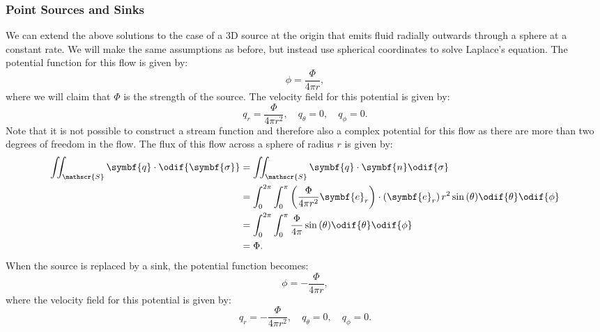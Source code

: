 \documentclass{article}
\theoremstyle{definition}
\begin{document}
\subsubsection{Point Sources and Sinks}
We can extend the above solutions to the case of a 3D source at the
origin that emits fluid radially outwards through a sphere at a
constant rate. We will make the same assumptions as before, but instead
use spherical coordinates to solve Laplace's equation. The potential
function for this flow is given by:
\begin{equation*}
    \phi = \frac{\Phi}{4\pi r},
\end{equation*}
where we will claim that \(\Phi\) is the strength of the source. The
velocity field for this potential is given by:
\begin{equation*}
    q_r = \frac{\Phi}{4\pi r^2}, \quad q_{\theta} = 0, \quad q_{\phi} = 0.
\end{equation*}
Note that it is not possible to construct a stream function and
therefore also a complex potential for this flow as there are more
than two degrees of freedom in the flow. The flux of this flow across a
sphere of radius \(r\) is given by:
\begin{align*}
    \iint_{\mathscr{S}} \symbf{q} \cdot \odif{\symbf{\sigma}} & = \iint_{\mathscr{S}} \symbf{q} \cdot \symbf{n} \odif{\sigma}                                                                                                                \\
                                                              & = \int_0^{2\pi} \int_0^{\pi} \left( \frac{\Phi}{4\pi r^2} \symbf{e}_{r} \right) \cdot \left( \symbf{e}_{r} \right) r^2 \sin{\left( \theta \right)} \odif{\theta} \odif{\phi} \\
                                                              & = \int_0^{2\pi} \int_0^{\pi} \frac{\Phi}{4\pi} \sin{\left( \theta \right)} \odif{\theta} \odif{\phi}                                                                         \\
                                                              & = \Phi.
\end{align*}
When the source is replaced by a sink, the potential function becomes:
\begin{equation*}
    \phi = -\frac{\Phi}{4\pi r},
\end{equation*}
where the velocity field for this potential is given by:
\begin{equation*}
    q_r = -\frac{\Phi}{4\pi r^2}, \quad q_{\theta} = 0, \quad q_{\phi} = 0.
\end{equation*}
\end{document}
